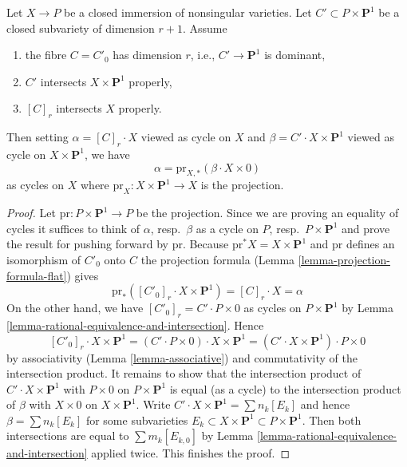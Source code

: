 \begin{lemma}
\label{lemma-transfer}
Let $X \to P$ be a closed immersion of nonsingular varieties.
Let $C' \subset P \times \mathbf{P}^1$ be a closed subvariety of dimension
$r + 1$. Assume
\begin{enumerate}
\item the fibre $C = C'_0$ has dimension $r$, i.e., $C' \to \mathbf{P}^1$
is dominant,
\item $C'$ intersects $X \times \mathbf{P}^1$ properly,
\item $[C]_r$ intersects $X$ properly.
\end{enumerate}
Then setting $\alpha = [C]_r \cdot X$ viewed as cycle on $X$ and
$\beta = C' \cdot X \times \mathbf{P}^1$ viewed as cycle on
$X \times \mathbf{P}^1$, we have
$$
\alpha = \text{pr}_{X, *}(\beta \cdot X \times 0)
$$
as cycles on $X$ where $\text{pr}_X : X \times \mathbf{P}^1 \to X$ is the
projection.
\end{lemma}

\begin{proof}
Let $\text{pr} : P \times \mathbf{P}^1 \to P$ be the projection.
Since we are proving an equality of cycles it suffices to think of
$\alpha$, resp.\ $\beta$ as a cycle on $P$, resp.\ $P \times \mathbf{P}^1$
and prove the result for pushing forward by $\text{pr}$.
Because $\text{pr}^*X = X \times \mathbf{P}^1$ and
$\text{pr}$ defines an isomorphism of $C'_0$ onto $C$
the projection formula (Lemma \ref{lemma-projection-formula-flat})
gives
$$
\text{pr}_*([C'_0]_r \cdot X \times \mathbf{P}^1) = [C]_r \cdot X = \alpha
$$
On the other hand, we have $[C'_0]_r = C' \cdot P \times 0$
as cycles on $P \times \mathbf{P}^1$
by Lemma \ref{lemma-rational-equivalence-and-intersection}.
Hence
$$
[C'_0]_r \cdot X \times \mathbf{P}^1 =
(C' \cdot P \times 0) \cdot X \times \mathbf{P}^1 =
(C' \cdot X \times \mathbf{P}^1) \cdot P \times 0
$$
by associativity (Lemma \ref{lemma-associative}) and commutativity of the
intersection product. It remains to show that the intersection product of
$C' \cdot X \times \mathbf{P}^1$ with $P \times 0$ on
$P \times \mathbf{P}^1$ is equal (as a cycle) to the intersection product of
$\beta$ with $X \times 0$ on $X \times \mathbf{P}^1$. Write
$C' \cdot X \times \mathbf{P}^1 = \sum n_k[E_k]$ and hence
$\beta = \sum n_k[E_k]$ for some subvarieties
$E_k \subset X \times \mathbf{P}^1 \subset P \times \mathbf{P}^1$.
Then both intersections are equal to $\sum m_k[E_{k, 0}]$ by
Lemma \ref{lemma-rational-equivalence-and-intersection} applied twice.
This finishes the proof.
\end{proof}




